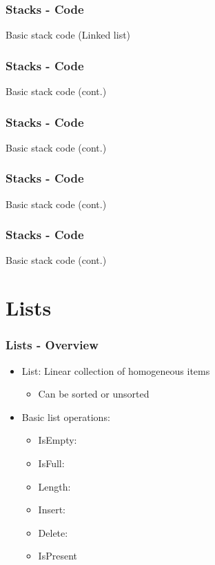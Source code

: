 \documentclass[c, aspectratio=169]{beamer}
\begin{document}
\begin{frame}\frametitle{Stacks - Code}
Basic stack code (Linked list)

%
\end{frame}

\begin{frame}\frametitle{Stacks - Code}
Basic stack code (cont.)

\end{frame}

\begin{frame}\frametitle{Stacks - Code}
Basic stack code (cont.)

\end{frame}

\begin{frame}\frametitle{Stacks - Code}
Basic stack code (cont.)

\end{frame}

\begin{frame}\frametitle{Stacks - Code}
Basic stack code (cont.)

\end{frame}

\section{Lists}
\begin{frame}\frametitle{Lists - Overview}
\begin{itemize}
\item List: Linear collection of homogeneous items
	\begin{itemize}
	\item Can be sorted or unsorted
	\end{itemize}
\item Basic list operations:
	\begin{itemize}
	\item IsEmpty: 
	\item IsFull:
	\item Length: 
	\item Insert: 
	\item Delete: 
	\item IsPresent
	\end{itemize}
\end{itemize}
\end{frame}
\end{document}
